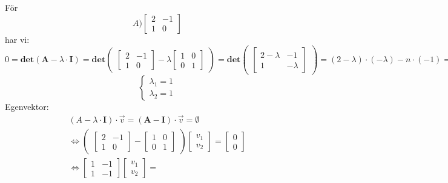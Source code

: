 \begin{Ex}
	För
	\[
	A ) \begin{bmatrix} 2&-1\\1&0 \end{bmatrix}
	\]
	har vi:
	\[
	0 = \mathbf{det}(\mathbf{A} - \lambda \cdot \mathbf{I}) = 
	\mathbf{det}
	\begin{pmatrix}
		\begin{bmatrix} 2&-1\\1&0 \end{bmatrix}
		- \lambda \begin{bmatrix} 1&0\\0&1 \end{bmatrix}
	\end{pmatrix}
	= \mathbf{det}
	\begin{pmatrix}
		\begin{bmatrix} 2- \lambda & -1\\1& - \lambda \end{bmatrix}
	\end{pmatrix}
	= (2 - \lambda)\cdot(-\lambda)-n \cdot (-1) = (\lambda - 1)^2
	\]
	\[
	\begin{cases}
		\lambda_1 = 1\\
		\lambda_2 = 1
	\end{cases}
	\]
	Egenvektor:
	\begin{gather*}
		(A - \lambda \cdot \mathbf{I}) \cdot \vec{v} = (\mathbf{A} - \mathbf{I}) \cdot \vec{v} = \emptyset\\
		\Leftrightarrow
		\begin{pmatrix}
			\begin{bmatrix} 2 &-1\\1&0 \end{bmatrix} -
			\begin{bmatrix} 1&0\\0&1 \end{bmatrix}
		\end{pmatrix}
		\begin{bmatrix} v_1\\v_2 \end{bmatrix} = 
		\begin{bmatrix} 0\\0 \end{bmatrix}\\
		\Leftrightarrow \begin{bmatrix} 1&-1\\1&-1 \end{bmatrix}
		\begin{bmatrix} v_1\\v_2 \end{bmatrix} = 

\end{gather*}
\end{Ex}
